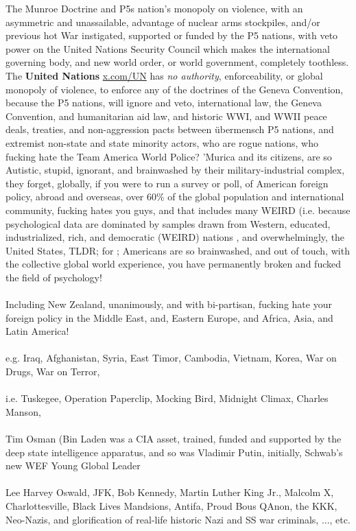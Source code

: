 \documentclass[16pt,openany,oneside]{book}
\begin{document}
The Munroe Doctrine and P5s nation's monopoly on violence, with an asymmetric and unassailable, advantage of nuclear arms stockpiles, and/or previous hot War instigated, supported or funded by the P5 nations, with veto power on the United Nations Security Council which makes the international governing body, and new world order, or world government, completely toothless.
The \textbf{United Nations} \url{x.com/UN} has \emph{no authority}, 
enforceability, or
global monopoly of violence, 
to enforce any of the doctrines of the Geneva Convention, because the P5 nations, will ignore and veto, 
international law, the 
Geneva Convention, and 
humanitarian aid law, and 
historic WWI, and WWII
peace deals, treaties, and non-aggression pacts between übermensch \cite{nietzsche1888thus} P5 nations, 
and extremist non-state and state minority actors, who are rogue nations, who fucking hate the Team America World Police? 
'Murica and its citizens, are so Autistic, stupid, ignorant, and brainwashed by their military-industrial complex, they forget, globally, if you were to run a survey or poll, of American foreign policy, abroad and overseas, over 60\% of the global population and international community, fucking hates you guys, and that includes many WEIRD 
(i.e. because psychological data are dominated by samples drawn from Western, educated, industrialized, rich, and democratic (WEIRD) nations \cite{muthukrishna2020beyondweird}, and overwhelmingly, the United States,
TLDR; for \cite{muthukrishna2020beyondweird}; Americans are so brainwashed, and out of touch, with the collective global world experience, you have permanently broken and fucked the field of psychology! 
\\\\
Including New Zealand, unanimously, and with bi-partisan, fucking hate your foreign policy in the 
Middle East, and,
Eastern Europe, and
Africa,
Asia, and 
Latin America!  
\\\\
e.g.
Iraq, 
Afghanistan, 
Syria, 
East Timor, 
Cambodia, 
Vietnam, 
Korea, 
War on Drugs, 
War on Terror,
\\\\
i.e.
Tuskegee, 
Operation Paperclip, 
Mocking Bird, 
Midnight Climax, 
Charles Manson, 
\\\\
Tim Osman (Bin Laden was a CIA asset, trained, funded and supported by the deep state intelligence apparatus, and so was Vladimir Putin, initially, Schwab's new WEF Young Global Leader
\\\\
Lee Harvey Oswald, 
JFK, 
Bob Kennedy, 
Martin Luther King Jr., 
Malcolm X, 
Charlottesville, 
Black Lives Mandsions, 
Antifa,
Proud Bous
QAnon, 
the KKK, 
Neo-Nazis, 
and glorification of real-life historic Nazi and SS war criminals, ..., etc.
\end{document}
